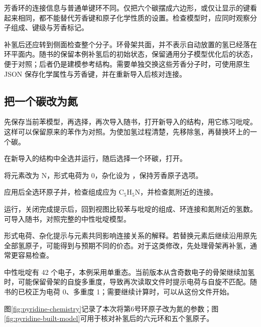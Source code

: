 芳香环的连接信息与普通单键环不同。仅把六个碳摆成六边形，或仅让显示的键看起来相同，都不能替代芳香键和原子化学性质的设置。检查模型时，应同时观察分子组成、键级与芳香标记。

补氢后还应转到侧面检查整个分子。环骨架共面，并不表示自动放置的氢已经落在环平面内。随书的保留本例补氢后的初始状态，\mbox{}保留通用分子模型优化后的状态，便于对照；后者仍是建模参考结构。需要单独交换这些芳香分子时，可使用原生 JSON 保存化学属性与芳香键，并在重新导入后核对连接。

\subsection{把一个碳改为氮}

先保存当前苯模型，再选择，再次导入随书，打开新导入的结构，用它练习吡啶。这样可以保留原来的苯作为对照。为使加氢过程清楚，先移除氢，再替换环上的一个碳。

\begin{steps}
  \item 在新导入的结构中全选并运行，随后选择一个环碳，打开。
  \item 将元素改为 N，形式电荷为 0，杂化设为 ，保持芳香原子选项。
\end{steps}



\begin{steps}[resume]
  \item 应用后全选环原子并，检查组成应为 $\mathrm{C_5H_5N}$，并检查氮附近的连接。
  \item 运行，关闭完成提示后，回到视图比较苯与吡啶的组成、环连接和氮附近的氢数。可导入随书，对照完整的中性吡啶模型。
\end{steps}

形式电荷、杂化提示与元素共同影响连接关系的解释。若替换元素后继续沿用原先全部氢原子，可能得到与预期不同的价态。对于这类修改，先处理骨架再补氢，通常更容易检查。

中性吡啶有 42 个电子，本例采用单重态。当前版本从含奇数电子的骨架继续加氢时，可能保留骨架的自旋多重度，导致再次读取文件时提示电荷与自旋不匹配。随书的已校正为电荷 0、多重度 1；需要继续计算时，可以从这份文件开始。

图\ref{fig:pyridine-chemistry}记录了本次将第6号环原子改为氮的参数；图\ref{fig:pyridine-built-model}可用于核对补氢后的六元环和五个氢原子。

